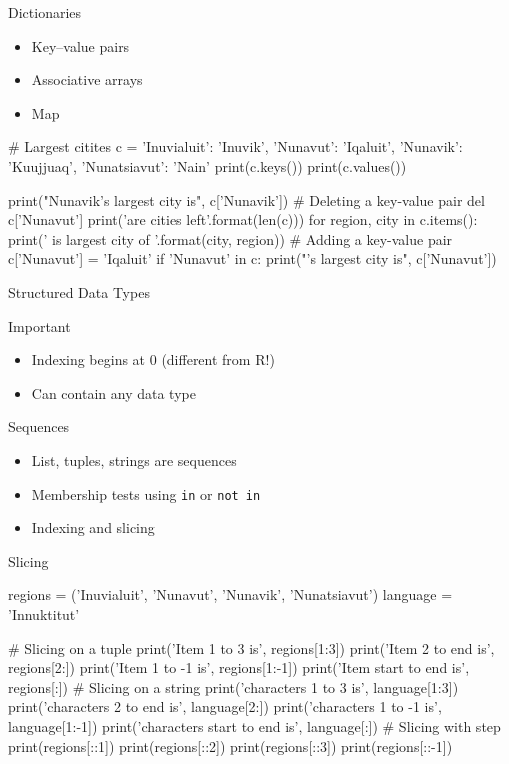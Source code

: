 \documentclass[ignorenonframetext,xcolor=x11names]{beamer}
\begin{document}
\begin{frame}[fragile]{Dictionaries}
\begin{itemize}
  \item Key--value pairs
  \item Associative arrays
  \item Map
\end{itemize}
\scriptsize
\begin{pythoncode}
# Largest citites
c = {
    'Inuvialuit': 'Inuvik',
    'Nunavut': 'Iqaluit',
    'Nunavik': 'Kuujjuaq',
    'Nunatsiavut': 'Nain' 
}
print(c.keys())
print(c.values())

print("Nunavik's largest city is", c['Nunavik'])
# Deleting a key-value pair
del c['Nunavut']
print('\nThere are {} cities left\n'.format(len(c)))
for region, city in c.items():
    print('{} is largest city of {}'.format(city, region))
# Adding a key-value pair
c['Nunavut'] = 'Iqaluit'
if 'Nunavut' in c:
    print("\nNunavut's largest city is", c['Nunavut'])
\end{pythoncode}
\end{frame}

\begin{frame}{Structured Data Types}
\begin{block}{Important}
\begin{itemize}
  \item Indexing begins at 0 (different from R!)
  \item Can contain any data type
\end{itemize}
\end{block}

\begin{block}{Sequences}
\begin{itemize}
  \item List, tuples, strings are sequences
  \item Membership tests using \texttt{in} or \texttt{not in}
  \item Indexing and slicing
\end{itemize}
\end{block}
\end{frame}

\begin{frame}[fragile]{Slicing}
\footnotesize
\begin{pythoncode}
regions = ('Inuvialuit', 'Nunavut', 
           'Nunavik', 'Nunatsiavut')
language = 'Innuktitut'

# Slicing on a tuple
print('Item 1 to 3 is', regions[1:3])
print('Item 2 to end is', regions[2:])
print('Item 1 to -1 is', regions[1:-1])
print('Item start to end is', regions[:])
# Slicing on a string 
print('characters 1 to 3 is', language[1:3])
print('characters 2 to end is', language[2:])
print('characters 1 to -1 is', language[1:-1])
print('characters start to end is', language[:])
# Slicing with step
print(regions[::1])
print(regions[::2])
print(regions[::3])
print(regions[::-1])
\end{pythoncode}
\end{frame}
\end{document}
